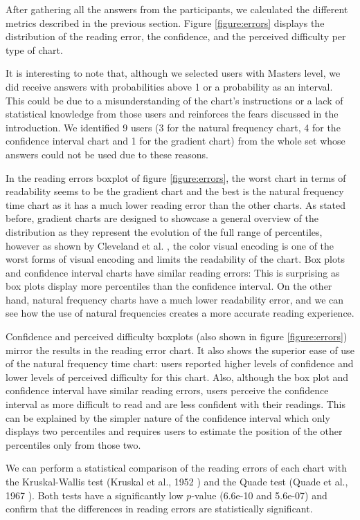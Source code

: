 \documentclass[a4paper,3p,sort&compress]{elsarticle}
\begin{document}
After gathering all the answers from the participants, we calculated the
different metrics described in the previous section. Figure \ref{figure:errors}
displays the distribution of the reading error, the confidence, and the
perceived difficulty per type of chart.

It is interesting to note that, although we selected users with Masters level,
we did receive answers with probabilities above 1 or a probability as an
interval. This could be due to a misunderstanding of the chart's instructions or
a lack of statistical knowledge from those users and reinforces the fears
discussed in the introduction. We identified 9 users (3 for the natural
frequency chart, 4 for the confidence interval chart and 1 for the gradient
chart) from the whole set whose answers could not be used due to these reasons.

In the reading errors boxplot of figure \ref{figure:errors}, the worst chart in
terms of readability seems to be the gradient chart and the best is the natural
frequency time chart as it has a much lower reading error than the other charts.
As stated before, gradient charts are designed to showcase a general overview of
the distribution as they represent the evolution of the full range of
percentiles, however as shown by Cleveland et al. \cite{cleveland_graphical_1984}, the
color visual encoding is one of the worst forms of visual encoding and
limits the readability of the chart. Box plots and confidence interval charts
have similar reading errors: This is surprising as box plots display more
percentiles than the confidence interval. On the other hand, natural frequency
charts have a much lower readability error, and we can see how the use of
natural frequencies creates a more accurate reading experience.

Confidence and perceived difficulty boxplots (also shown in figure
\ref{figure:errors}) mirror the results in the reading error chart. It also
shows the superior ease of use of the natural frequency time chart: users
reported higher levels of confidence and lower levels of perceived difficulty
for this chart. Also, although the box plot and confidence interval have similar
reading errors, users perceive the confidence interval as more difficult to read
and are less confident with their readings. This can be explained by the simpler
nature of the confidence interval which only displays two percentiles and
requires users to estimate the position of the other percentiles only from those
two.

We can perform a statistical comparison of the reading errors of each chart with
the Kruskal-Wallis test (Kruskal et al., 1952 \cite{krustal}) 
and the Quade test (Quade et al., 1967 \cite{quade_rank_1967}). 
Both tests have a significantly low $p$-value (6.6e-10
and 5.6e-07) and confirm that the differences in reading errors are
statistically significant.
\end{document}
